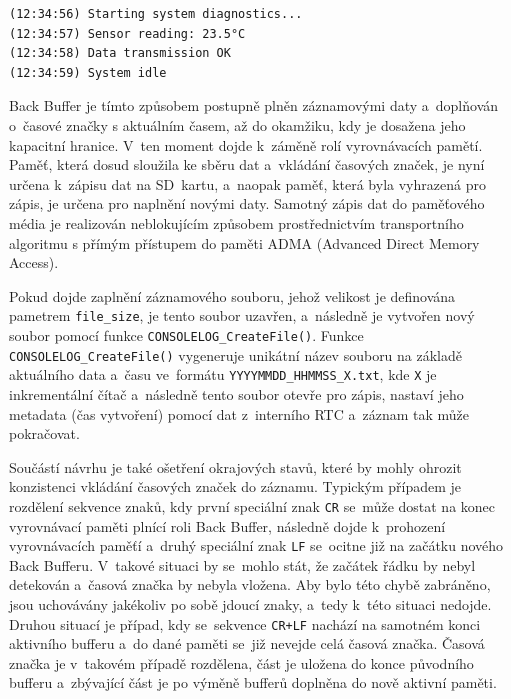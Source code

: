 \begin{verbatim}
(12:34:56) Starting system diagnostics...
(12:34:57) Sensor reading: 23.5°C
(12:34:58) Data transmission OK
(12:34:59) System idle
\end{verbatim}

Back Buffer je tímto způsobem postupně plněn záznamovými daty a~doplňován o~časové značky s aktuálním časem, až do okamžiku, kdy je dosažena jeho kapacitní hranice. V~ten moment dojde k~záměně rolí vyrovnávacích pamětí. Paměť, která dosud sloužila ke sběru dat a~vkládání časových značek, je nyní určena k~zápisu dat na SD~kartu, a~naopak paměť, která byla vyhrazená pro zápis, je určena pro naplnění novými daty. Samotný zápis dat do paměťového média je realizován neblokujícím způsobem prostřednictvím transportního algoritmu s přímým přístupem do paměti ADMA (Advanced Direct Memory Access).~\cite{nxp_MCX_Nx4x_Reference_Manual}

Pokud dojde zaplnění záznamového souboru, jehož velikost je definována pametrem \texttt{file\_size}, je tento soubor uzavřen, a~následně je vytvořen nový soubor pomocí funkce \texttt{CONSOLELOG\_CreateFile()}. Funkce \texttt{CONSOLELOG\_CreateFile()} vygeneruje unikátní název souboru na základě aktuálního data a~času ve~formátu \texttt{YYYYMMDD\_HHMMSS\_X.txt}, kde \texttt{X} je inkrementální čítač a~následně tento soubor otevře pro zápis, nastaví jeho metadata (čas vytvoření) pomocí dat z~interního RTC a~záznam tak může pokračovat.

Součástí návrhu je také ošetření okrajových stavů, které by mohly ohrozit konzistenci vkládání časových značek do záznamu. Typickým případem je rozdělení sekvence znaků, kdy první speciální znak \texttt{CR} se~může dostat na konec vyrovnávací paměti plnící roli Back Buffer, následně dojde k~prohození vyrovnávacích paměťí a~druhý speciální znak \texttt{LF} se~ocitne již na začátku nového Back Bufferu. V~takové situaci by se~mohlo stát, že začátek řádku by nebyl detekován a~časová značka by nebyla vložena. Aby bylo této chybě zabráněno, jsou uchovávány jakékoliv po sobě jdoucí znaky, a~tedy k~této situaci nedojde. Druhou situací je případ, kdy se~sekvence \texttt{CR+LF} nachází na samotném konci aktivního bufferu a~do dané paměti se~již nevejde celá časová značka. Časová značka je v~takovém případě rozdělena, část je uložena do konce původního bufferu a~zbývající část je po výměně bufferů doplněna do nově aktivní paměti.

